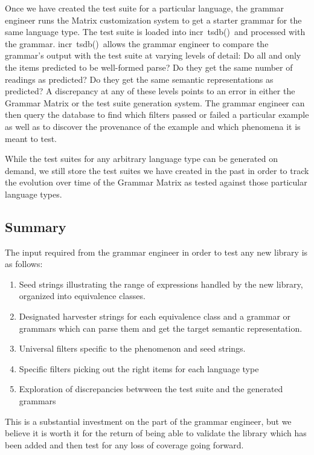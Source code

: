 \documentclass[11pt]{article}
\newcommand{\itsdb}{\mbox{\sf \lbrack incr tsdb()\rbrack}}
\begin{document}
Once we have created the test suite for a particular language, the
grammar engineer runs the Matrix customization system to get a starter
grammar for the same language type.  The test suite is loaded into
\itsdb\ and processed with the grammar.  \itsdb\ allows the grammar
engineer to compare the grammar's output with the test suite at
varying levels of detail: Do all and only the items predicted to be
well-formed parse?  Do they get the same number of readings as
predicted?  Do they get the same semantic representations as
predicted?  A discrepancy at any of these levels points to an error in
either the Grammar Matrix or the test suite generation system.  The
grammar engineer can then query the database to find which filters
passed or failed a particular example as well as to discover the
provenance of the example and which phenomena it is meant to test.

While the test suites for any arbitrary language type can be
generated on demand, we still store the test suites we have created
in the past in order to track the evolution over time of the Grammar
Matrix as tested against those particular language types.

\subsection{Summary}

The input required from the grammar engineer in order to
test any new library is as follows:

\begin{enumerate}
\item Seed strings illustrating the range of expressions
handled by the new library, organized into equivalence
classes.
\item Designated harvester strings for each equivalence class
and a grammar or grammars which can parse them and get
the target semantic representation.
\item Universal filters specific to the phenomenon and
seed strings.
\item Specific filters picking out the right items for
each language type
\item Exploration of discrepancies betwween the test suite
and the generated grammars
\end{enumerate}
%
This is a substantial investment on the part of the grammar
engineer, but we believe it is worth it for the return of
being able to validate the library which has been added and
then test for any loss of coverage going forward.
\end{document}
